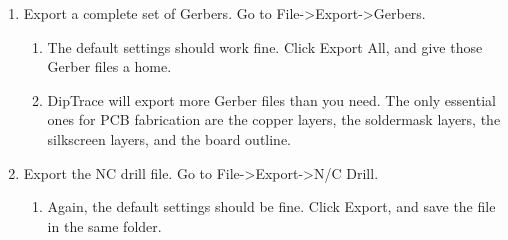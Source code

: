 \documentclass[letterpaper]{article}
\newcounter{saveenum}
\newcommand\liststyleRTFNumvi{%
\renewcommand\theenumi{\arabic{enumi}}
\renewcommand\theenumii{\alph{enumii}}
\renewcommand\theenumiii{\roman{enumiii}}
\renewcommand\theenumiv{\arabic{enumiv}}
\renewcommand\labelenumi{\theenumi.}
\renewcommand\labelenumii{\theenumii.}
\renewcommand\labelenumiii{\theenumiii.}
\renewcommand\labelenumiv{\theenumiv.}
}
\begin{document}
\liststyleRTFNumvi
\setcounter{saveenum}{\value{enumi}}
\begin{enumerate}
\setcounter{enumi}{\value{saveenum}}
\item {\sffamily\color[rgb]{0.30980393,0.5058824,0.7411765}
Export a complete set of Gerbers. Go to File-{\textgreater}Export-{\textgreater}Gerbers.}

\setcounter{saveenum}{\value{enumii}}
\begin{enumerate}
\setcounter{enumii}{\value{saveenum}}
\item {\sffamily\color[rgb]{0.30980393,0.5058824,0.7411765}
The default settings should work fine. Click {\textquotedbl}Export All,{\textquotedbl} and give those Gerber files a
home.}
\item {\sffamily\color[rgb]{0.30980393,0.5058824,0.7411765}
DipTrace will export more Gerber files than you need. The only essential ones for PCB fabrication are the copper layers,
the soldermask layers, the silkscreen layers, and the board outline.}
\end{enumerate}
\item {\sffamily\color[rgb]{0.30980393,0.5058824,0.7411765}
Export the NC drill file. Go to File-{\textgreater}Export-{\textgreater}N/C Drill.}

\setcounter{saveenum}{\value{enumii}}
\begin{enumerate}
\setcounter{enumii}{\value{saveenum}}
\item {\sffamily\color[rgb]{0.30980393,0.5058824,0.7411765}
Again, the default settings should be fine. Click {\textquotedbl}Export,{\textquotedbl} and save the file in the same
folder.}
\end{enumerate}
\end{enumerate}
\clearpage
\bigskip
\end{document}
